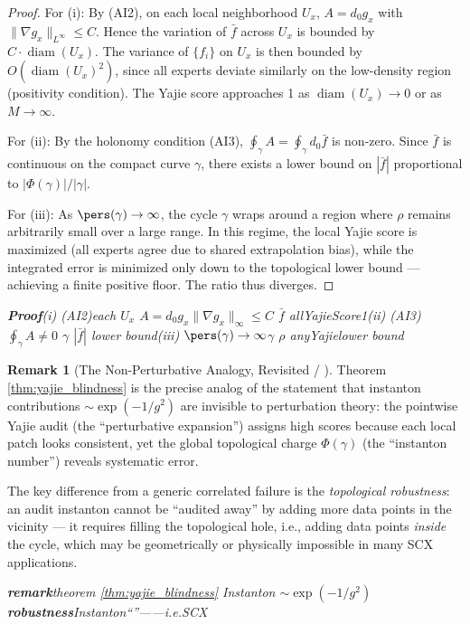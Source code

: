 \documentclass[11pt,a4paper]{article}
\theoremstyle{plain}
\theoremstyle{definition}
\newtheorem{remark}[theorem]{Remark}
\DeclareMathOperator{\diam}{diam}
\begin{document}
\begin{proof}
For (i): By (AI2), on each local neighborhood $U_x$, $A = d_0 g_x$ with 
$\|\nabla g_x\|_{L^{\infty}} \leq C$. Hence the variation of $\bar{f}$
across $U_x$ is bounded by $C \cdot \diam(U_x)$. The variance of 
$\{f_i\}$ on $U_x$ is then bounded by $O(\diam(U_x)^2)$, since all experts 
deviate similarly on the low-density region (positivity condition). 
The Yajie score approaches 1 as $\diam(U_x) \to 0$ or as $M \to \infty$.

For (ii): By the holonomy condition (AI3), 
$\oint_{\gamma} A = \oint_{\gamma} d_0 \bar{f}$ is non-zero. Since 
$\bar{f}$ is continuous on the compact curve $\gamma$, there exists 
a lower bound on $|\bar{f}|$ proportional to $|\Phi(\gamma)|/|\gamma|$.

For (iii): As $\pers(\gamma) \to \infty$, the cycle $\gamma$ wraps around 
a region where $\rho$ remains arbitrarily small over a large range. In 
this regime, the local Yajie score is maximized (all experts agree due to 
shared extrapolation bias), while the integrated error is minimized only 
down to the topological lower bound — achieving a finite positive floor. 
The ratio thus diverges.
\end{proof}

\bigskip
\noindent
\textit{\textbf{Proof}(i) (AI2)each $U_x$  $A = d_0 g_x$$\|\nabla g_x\|_{\infty} \leq C$ $\bar{f}$ allYajieScore1(ii) (AI3)$\oint_{\gamma} A \neq 0$ $\gamma$  $|\bar{f}|$ lower bound(iii)  $\pers(\gamma) \to \infty$$\gamma$  $\rho$ anyYajielower bound}

\begin{remark}[The Non-Perturbative Analogy, Revisited / ]
Theorem \ref{thm:yajie_blindness} is the precise analog of the statement 
that instanton contributions $\sim \exp(-1/g^2)$ are invisible to 
perturbation theory: the pointwise Yajie audit (the ``perturbative expansion'') 
assigns high scores because each local patch looks consistent, yet the 
global topological charge $\Phi(\gamma)$ (the ``instanton number'') 
reveals systematic error.

The key difference from a generic correlated failure is the \emph{topological 
robustness}: an audit instanton cannot be ``audited away'' by adding more 
data points in the vicinity — it requires filling the topological hole, 
i.e., adding data points \emph{inside} the cycle, which may be 
geometrically or physically impossible in many SCX applications.
\end{remark}

\bigskip
\noindent
\textit{\textbf{remark}theorem \ref{thm:yajie_blindness} Instanton $\sim \exp(-1/g^2)$ \textbf{robustness}Instanton``''——i.e.\textbf{}SCX}
\end{document}
